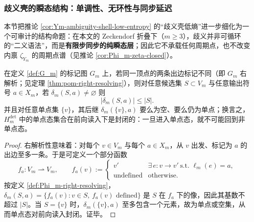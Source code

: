 \subsubsection{歧义壳的瞬态结构：单调性、无环性与同步延迟}\label{subsec:Ym-amb-transient}
本节把推论 \ref{cor:Ym-ambiguity-shell-low-entropy} 的“歧义壳低熵”进一步细化为一个可审计的结构命题：在本文的 Zeckendorf 折叠下（$m\ge 3$），歧义并非可循环的“二义语法”，而是\textbf{有限步同步的纯瞬态层}；因此它不承载任何周期点，也不改变内禀 \(\zeta_{Y_m}\) 的周期点谱（见推论 \ref{cor:Phi_m-zeta-closed}）。

\begin{proposition}\label{prop:det-candidate-set-monotone}
在定义 \ref{def:G_m} 的标记图 $G_m$ 上，若同一顶点的两条出边标记不同（即 $G_m$ 右解析；见定理 \ref{thm:pom-right-resolving}），则对任意候选集 $S\subset V_m$ 与任意输出符号 $a\in X_m$，若 $\delta_m(S,a)\neq\varnothing$ 则
\[
|\delta_m(S,a)|\le |S|.
\]
并且对任意单点集 $\{v\}$，其后继 $\delta_m(\{v\},a)$ 要么为空、要么仍为单点；换言之，$H_m^{\mathrm{det}}$ 中的单点态集合在前向读入下是封闭的：一旦进入单点态，就不可能回到非单点态。
\end{proposition}
\begin{proof}
右解析性意味着：对每个 $v\in V_m$ 与每个 $a\in X_m$，从 $v$ 出发、标记为 $a$ 的出边至多一条。于是可定义一个部分函数
\[
f_a:V_m\rightharpoonup V_m,\qquad
f_a(v):=
\begin{cases}
v' & \exists\,e:v\to v'\ \text{s.t. }\ell_m(e)=a,\\
\text{undefined} & \text{otherwise}.
\end{cases}
\]
按定义 \ref{def:Phi_m-right-resolving}，
\(
\delta_m(S,a)=\{f_a(v):v\in S,\ f_a(v)\text{ defined}\}
\)
是 $S$ 在 $f_a$ 下的像，因此其基数不超过 $|S|$。当 $S=\{v\}$ 时，$\delta_m(\{v\},a)$ 至多包含一个元素，故为单点或空集，从而单点态对前向读入封闭。证毕。
\end{proof}

